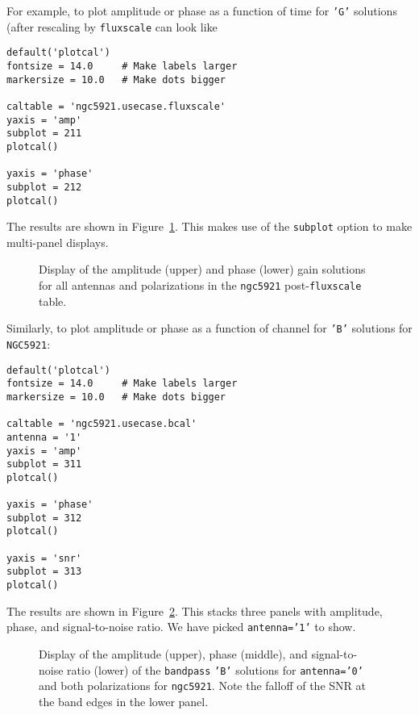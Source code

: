 For example, to plot amplitude or phase as a function of time for 
{\tt 'G'} solutions (after rescaling by {\tt fluxscale} can look like 
\small
\begin{verbatim}
default('plotcal')
fontsize = 14.0     # Make labels larger
markersize = 10.0   # Make dots bigger

caltable = 'ngc5921.usecase.fluxscale'
yaxis = 'amp'
subplot = 211
plotcal()

yaxis = 'phase'
subplot = 212
plotcal()
\end{verbatim}
\normalsize
The results are shown in Figure~\ref{fig:plotcal_G_5921}.  This makes 
use of the {\tt subplot} option to make multi-panel displays.

\begin{figure}[h!]
\begin{center}
\caption{\label{fig:plotcal_G_5921} Display of the amplitude (upper)
and phase (lower) gain solutions for all antennas and polarizations 
in the {\tt ngc5921} post-{\tt fluxscale} table.} 
\hrulefill
\end{center}
\end{figure}


Similarly, to plot amplitude or phase as a function of channel for
{\tt 'B'} solutions for {\tt NGC5921}:
\small
\begin{verbatim}
default('plotcal')
fontsize = 14.0     # Make labels larger
markersize = 10.0   # Make dots bigger

caltable = 'ngc5921.usecase.bcal'
antenna = '1'
yaxis = 'amp'
subplot = 311
plotcal()

yaxis = 'phase'
subplot = 312
plotcal()

yaxis = 'snr'
subplot = 313
plotcal()
\end{verbatim}
\normalsize
The results are shown in Figure~\ref{fig:plotcal_B_5921}.  This stacks
three panels with amplitude, phase, and signal-to-noise ratio.  We
have picked {\tt antenna='1'} to show.

\begin{figure}[h!]
\begin{center}
\caption{\label{fig:plotcal_B_5921} Display of the amplitude (upper),
phase (middle), and signal-to-noise ratio (lower) of the
{\tt bandpass} {\tt 'B'} solutions for {\tt antenna='0'} and both
polarizations for {\tt ngc5921}.  Note the falloff of the SNR at
the band edges in the lower panel.} 
\hrulefill
\end{center}
\end{figure}

